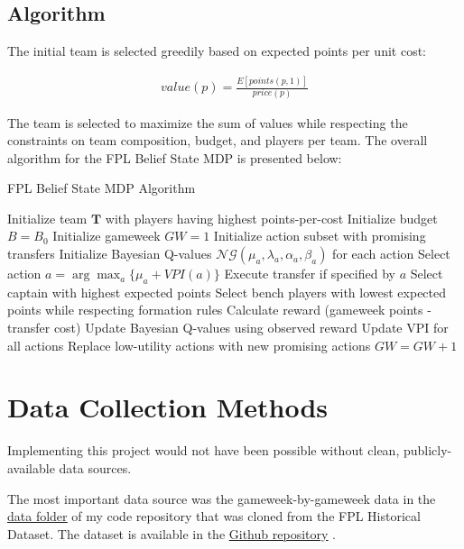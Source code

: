 \subsection{Algorithm}
The initial team is selected greedily based on expected points per unit cost:

\begin{align}
value(p) = \frac{E[points(p, 1)]}{price(p)}
\end{align}

The team is selected to maximize the sum of values while respecting the constraints on team composition, budget, and players per team.
The overall algorithm for the FPL Belief State MDP is presented below:

\begin{algorithm}
\caption{FPL Belief State MDP Algorithm}
\begin{algorithmic}[1]
\State Initialize team $\mathbf{T}$ with players having highest points-per-cost
\State Initialize budget $B = B_0$
\State Initialize gameweek $GW = 1$
\State Initialize action subset with promising transfers
\State Initialize Bayesian Q-values $\mathcal{NG}(\mu_a, \lambda_a, \alpha_a, \beta_a)$ for each action
    \State Select action $a = \arg\max_a \{\mu_a + VPI(a)\}$
    \State Execute transfer if specified by $a$
    \State Select captain with highest expected points
    \State Select bench players with lowest expected points while respecting formation rules
    \State Calculate reward (gameweek points - transfer cost)
    \State Update Bayesian Q-values using observed reward
    \State Update VPI for all actions
    \State Replace low-utility actions with new promising actions
    \State $GW = GW + 1$
\EndWhile
\end{algorithmic}
\end{algorithm}

\section{Data Collection Methods}
Implementing this project would not have been possible without clean, publicly-available data sources. 

The most important data source was the gameweek-by-gameweek data in the \href{https://github.com/MUN3N3Z/FPL_AI/tree/main/data}{\underline{data folder}} of my code repository that was cloned from the FPL Historical Dataset. The dataset is available in the \href{https://github.com/vaastav/Fantasy-Premier-League/tree/master}{\underline{Github repository}} \cite{anand2016fantasypremierleague}.

